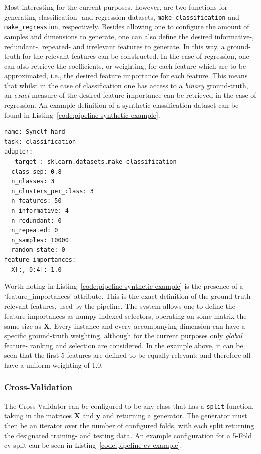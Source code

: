 \documentclass[../main.tex]{subfiles}
\begin{document}
Most interesting for the current purposes, however, are two functions for generating classification- and regression datasets, \texttt{make\_classification} and \texttt{make\_regression}, respectively. Besides allowing one to configure the amount of samples and dimensions to generate, one can also define the desired informative-, redundant-, repeated- and irrelevant features to generate. In this way, a ground-truth for the relevant features can be constructed. In the case of regression, one can also retrieve the coefficients, or weighting, for each feature which are to be approximated, i.e., the desired feature importance for each feature. This means that whilst in the case of classification one has access to a \textit{binary} ground-truth, an \textit{exact} measure of the desired feature importance can be retrieved in the case of regression. An example definition of a synthetic classification dataset can be found in Listing~\ref{code:pipeline-synthetic-example}.

\begin{lstlisting}[caption={A dataset config generating a synthetic dataset using the sci-kit learn \texttt{make\_classification} function.}, label={code:pipeline-synthetic-example}]
name: Synclf hard
task: classification
adapter:
  _target_: sklearn.datasets.make_classification
  class_sep: 0.8
  n_classes: 3
  n_clusters_per_class: 3
  n_features: 50
  n_informative: 4
  n_redundant: 0
  n_repeated: 0
  n_samples: 10000
  random_state: 0
feature_importances:
  X[:, 0:4]: 1.0
\end{lstlisting}

Worth noting in Listing~\ref{code:pipeline-synthetic-example} is the presence of a `feature\_importances' attribute. This is the exact definition of the ground-truth relevant features, used by the pipeline. The system allows one to define the feature importances as numpy-indexed selectors, operating on some matrix the same size as $\mathbf{X}$. Every instance and every accompanying dimension can have a specific ground-truth weighting, although for the current purposes only \textit{global} feature- ranking and selection are considered. In the example above, it can be seen that the first 5 features are defined to be equally relevant: and therefore all have a uniform weighting of 1.0.




\subsubsection{Cross-Validation}
The Cross-Validator can be configured to be any class that has a \texttt{split} function, taking in the matrices $\mathbf{X}$ and $\mathbf{y}$ and returning a generator. The generator must then be an iterator over the number of configured folds, with each split returning the designated training- and testing data. An example configuration for a 5-Fold \gls{cv} split can be seen in Listing~\ref{code:pipeline-cv-example}.
\end{document}
